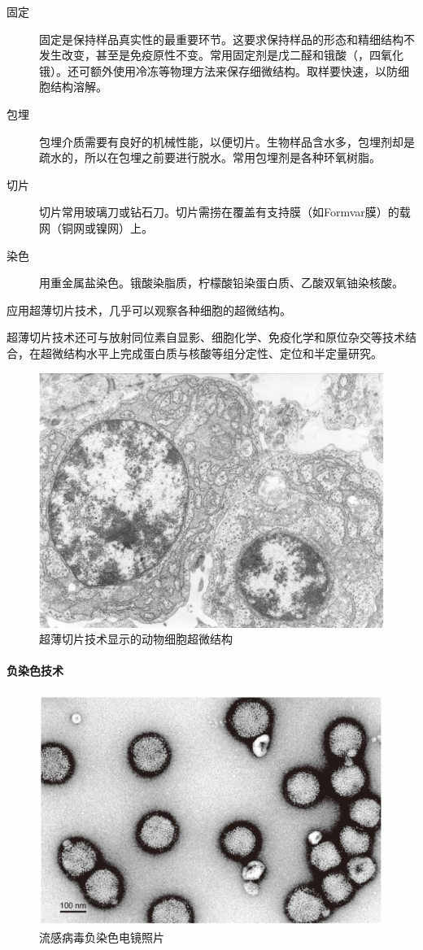 \begin{description}
	\item[固定] 固定是保持样品真实性的最重要环节。这要求保持样品的形态和精细结构不发生改变，甚至是免疫原性不变。常用固定剂是戊二醛和锇酸（，四氧化锇）。还可额外使用冷冻等物理方法来保存细微结构。取样要快速，以防细胞结构溶解。
	\item[包埋] 包埋介质需要有良好的机械性能，以便切片。生物样品含水多，包埋剂却是疏水的，所以在包埋之前要进行脱水。常用包埋剂是各种环氧树脂。
	\item[切片] 切片常用玻璃刀或钻石刀。切片需捞在覆盖有支持膜（如Formvar膜）的载网（铜网或镍网）上。
	\item[染色] 用重金属盐染色。锇酸染脂质，柠檬酸铅染蛋白质、乙酸双氧铀染核酸。
\end{description}

应用超薄切片技术，几乎可以观察各种细胞的超微结构。

超薄切片技术还可与放射同位素自显影、细胞化学、免疫化学和原位杂交等技术结合，在超微结构水平上完成蛋白质与核酸等组分定性、定位和半定量研究。

\begin{figure}[htbp]
	\centering
	\includegraphics[width=0.5\linewidth]{Pics/超薄切片技术显示的动物细胞超微结构}
	\caption{超薄切片技术显示的动物细胞超微结构}
	\label{fig:ultrathinSectioningTechnologyShowingUltrastructureOfAnimalCells}
\end{figure}

\paragraph{负染色技术}

\begin{figure}[htbp]
	\centering
	\includegraphics[width=0.5\linewidth]{Pics/流感病毒负染色电镜照片}
	\caption{流感病毒负染色电镜照片}
	\label{fig:influenzaVirusNegativeStainingElectronMicrograph}
\end{figure}


